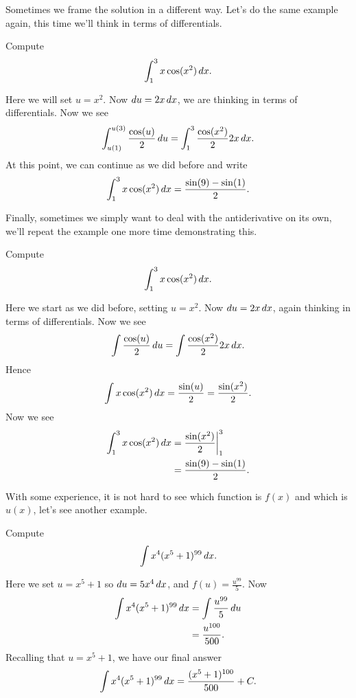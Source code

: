 Sometimes we frame the solution in a different way. Let's do the same
example again, this time we'll think in terms of differentials.

\begin{example}
Compute
\[
\int_1^3 x\cos(x^2)\, d x.
\]
\end{example}
\begin{solution}
Here we will set $u=x^2$. Now $du = 2x \, d x$, we are thinking in terms
of differentials. Now we see
\[
\int_{u(1)}^{u(3)} \frac{\cos(u)}{2}\, d u = \int_1^3\frac{\cos(x^2)}{2}2x\, d x.
\]
At this point, we can continue as we did before and write
\[
\int_1^3 x\cos(x^2)\, d x= \frac{\sin(9) -\sin(1)}{2}.
\]
\end{solution}

Finally, sometimes we simply want to deal with the antiderivative on
its own, we'll repeat the example one more time demonstrating this.

\begin{example}
Compute
\[
\int_1^3 x\cos(x^2)\, d x.
\]
\end{example}
\begin{solution}
Here we start as we did before, setting $u=x^2$. Now $du = 2x \, d x$,
again thinking in terms of differentials. Now we see
\[
\int  \frac{\cos(u)}{2}\, d u = \int \frac{\cos(x^2)}{2}2x\, d x.
\]
Hence 
\[
\int x\cos(x^2)\, d x = \frac{\sin(u)}{2} = \frac{\sin(x^2)}{2}.
\]
Now we see
\begin{align*}
\int_1^3 x\cos(x^2)\, d x &=\frac{\sin(x^2)}{2}\bigg|_1^3\\
&= \frac{\sin(9) -\sin(1)}{2}.
\end{align*}
\end{solution}

With some experience, it is not hard to see which function is $f(x)$
and which is $u(x)$, let's see another example.
\begin{example}
Compute
\[
\int x^4(x^5+1)^{99} \, d x.
\]
\end{example}

\begin{solution}
Here we set $u = x^5+1$ so $du = 5x^4 \, d x$, and $f(u) = \frac{u^{99}}{5}$. Now
\begin{align*}
\int x^4(x^5+1)^{99} \, d x &= \int \frac{u^{99}}{5} \, d u\\
&= \frac{u^{100}}{500}.
\end{align*}
Recalling that $u = x^5+1$, we have our final answer
\[
\int x^4(x^5+1)^{99} \, d x= \frac{(x^5+1)^{100}}{500}+C.
\]
\end{solution}



